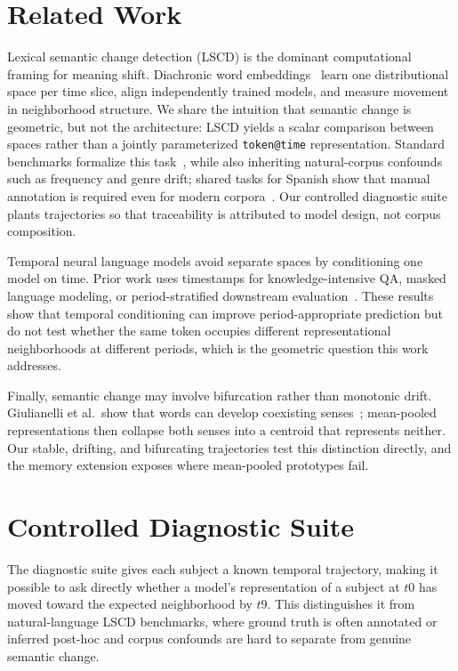 \documentclass[runningheads]{llncs}
\begin{document}
\section{Related Work}
Lexical semantic change detection (LSCD) is the dominant computational framing
for meaning shift. Diachronic word embeddings~\cite{hamilton2016diachronic}
learn one distributional space per time slice, align independently trained
models, and measure movement in neighborhood structure. We share the intuition
that semantic change is geometric, but not the architecture: LSCD yields a
scalar comparison between spaces rather than a jointly parameterized
\texttt{token@time} representation. Standard benchmarks formalize this
task~\cite{schlechtweg2020semeval,tahmasebi2021survey}, while also inheriting
natural-corpus confounds such as frequency and genre drift; shared tasks for
Spanish show that manual annotation is required even for modern
corpora~\cite{zamora2022lscdiscovery}. Our controlled diagnostic suite plants trajectories so that traceability is
attributed to model design, not corpus composition.

Temporal neural language models avoid separate spaces by conditioning one model
on time. Prior work uses timestamps for knowledge-intensive QA, masked language
modeling, or period-stratified downstream
evaluation~\cite{dhingra2022timeaware,rosin2022timemasking,loureiro2022timelms}. These results show that temporal conditioning can improve period-appropriate
prediction but do not test whether the same token occupies different
representational neighborhoods at different periods, which is the geometric
question this work addresses.

Finally, semantic change may involve bifurcation rather than monotonic drift.
Giulianelli et al.\ show that words can develop coexisting
senses~\cite{giulianelli2020analysing}; mean-pooled representations then collapse
both senses into a centroid that represents neither. Our stable, drifting, and
bifurcating trajectories test this distinction directly, and the memory
extension exposes where mean-pooled prototypes fail.

\section{Controlled Diagnostic Suite}
The diagnostic suite gives each subject a known temporal trajectory, making it
possible to ask directly whether a model's representation of a subject at \(t0\)
has moved toward the expected neighborhood by \(t9\). This distinguishes it from
natural-language LSCD benchmarks, where ground truth is often annotated or
inferred post-hoc and corpus confounds are hard to separate from genuine semantic
change.
\end{document}
